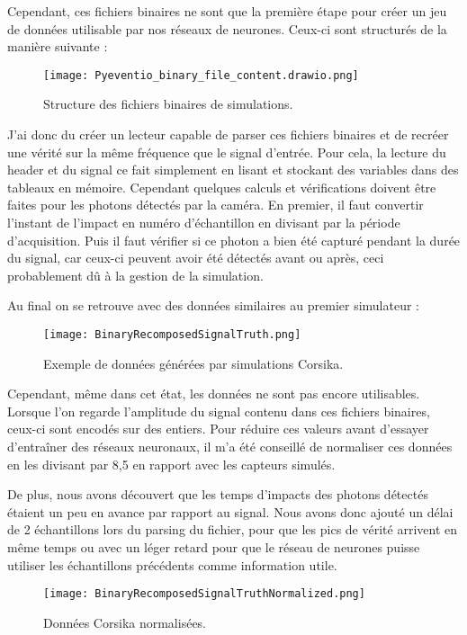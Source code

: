 Cependant, ces fichiers binaires ne sont que la première étape pour créer un jeu de données utilisable par nos réseaux de neurones.
Ceux-ci sont structurés de la manière suivante :

\begin{figure}[tbph!]
	\centering
	\texttt{[image: Pyeventio\_binary\_file\_content.drawio.png]}
	\caption[Structure des fichiers binaires de simulations]{Structure des fichiers binaires de simulations.}
\end{figure}

J'ai donc du créer un lecteur capable de parser ces fichiers binaires et de recréer une vérité sur la même fréquence que le signal d'entrée.
Pour cela, la lecture du header et du signal ce fait simplement en lisant et stockant des variables dans des tableaux en mémoire.
Cependant quelques calculs et vérifications doivent être faites pour les photons détectés par la caméra. 
En premier, il faut convertir l'instant de l'impact en numéro d'échantillon en divisant par la période d'acquisition.
Puis il faut vérifier si ce photon a bien été capturé pendant la durée du signal, car ceux-ci peuvent avoir été détectés
avant ou après, ceci probablement dû à la gestion de la simulation.

\newpage
Au final on se retrouve avec des données similaires au premier simulateur :
\begin{figure}[tbph!]
	\centering
	\texttt{[image: BinaryRecomposedSignalTruth.png]}
	\caption[Exemple de données générées par simulations Corsika]{Exemple de données générées par simulations Corsika.}
\end{figure}

Cependant, même dans cet état, les données ne sont pas encore utilisables. Lorsque l'on regarde l'amplitude 
du signal contenu dans ces fichiers binaires, ceux-ci sont encodés sur des entiers. Pour réduire ces valeurs avant d'essayer
d'entraîner des réseaux neuronaux, il m'a été conseillé de normaliser ces données en les divisant par 8,5 en rapport avec les
capteurs simulés.

De plus, nous avons découvert que les temps d'impacts des photons détectés étaient un peu en avance par rapport
au signal. Nous avons donc ajouté un délai de 2 échantillons lors du parsing du fichier, pour que les pics de vérité arrivent en 
même temps ou avec un léger retard pour que le réseau de neurones puisse utiliser les échantillons précédents comme information utile.

\newpage
\begin{figure}[tbph!]
	\centering
	\texttt{[image: BinaryRecomposedSignalTruthNormalized.png]}
	\caption[Données Corsika normalisées]{Données Corsika normalisées.}
\end{figure}

